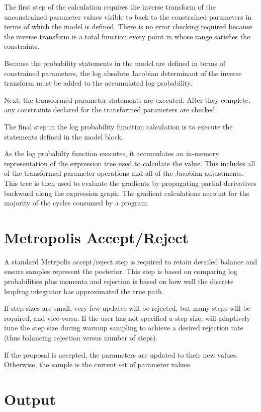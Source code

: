 The first step of the calculation requires the inverse transform of
the unconstrained parameter values visible to \HMC back to the
constrained parameters in terms of which the model is defined.  There
is no error checking required because the inverse transform is 
a total function every point in whose range satisfies the constraints.

Because the probability statements in the model are defined in terms
of constrained parameters, the log absolute Jacobian determinant of
the inverse transform must be added to the accumulated log
probability.

Next, the transformed parameter statements are executed.  After they
complete, any constraints declared for the transformed parameters are
checked.  

The final step in the log probability funcition calculation is to
execute the statements defined in the model block.  

As the log probabilty function executes, it accumulates an in-memory
representation of the expression tree used to calculate the value.
This includes all of the transformed parameter operations and all of
the Jacobian adjustments.  This tree is then used to evaluate the
gradients by propagating partial derivatives backward along the
expression graph.  The gradient calculations account for the majority
of the cycles consumed by a \Stan program.

\section{Metropolis Accept/Reject}

A standard Metrpolis accept/reject step is required to retain detailed
balance and ensure samples represent the posterior.  This step is
based on comparing log probabilities plus momenta and rejection is
based on how well the discrete leapfrog integrator has approximated
the true path.  

If step sizes are small, very few updates will be rejected, but many
steps will be required, and vice-versa.  If the user has not specified
a step size, \Stan will adaptively tune the step size during warmup
sampling to achieve a desired rejection rate (thus balancing rejection
versus number of steps).  

If the proposal is accepted, the parameters are updated to their new
values.  Otherwise, the sample is the current set of parameter values.


\section{Output}

